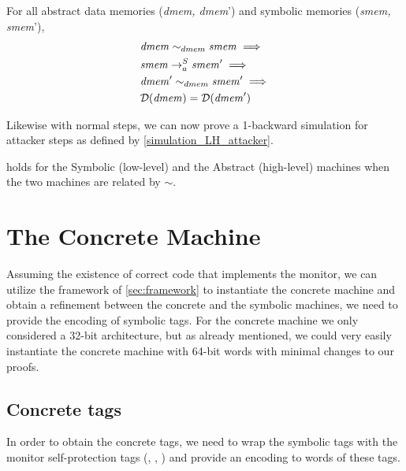 \begin{lemma}
\label{dmem_attacker_preserves_domain}
  For all abstract data memories (\textit{dmem, dmem}')
  and symbolic memories (\textit{smem, smem}'),
  \begin{align*}
    & \mathit{dmem} \sim_{dmem} \mathit{smem} \implies \\
    & \stepa{\mathit{smem}}{\mathit{smem}'}{S} \implies \\
    & \mathit{dmem}' \sim_{dmem} \mathit{smem}' \implies \\
    & \mathcal{D}(\mathit{dmem}) = \mathcal{D}(\mathit{dmem}')
  \end{align*}
\end{lemma}

Likewise with normal steps, we can now prove a 1-backward
simulation for attacker steps as defined by \cref{simulation_LH_attacker}.

\begin{theorem}
\label{simulation_SA_attacker}
 holds for the Symbolic (low-level) and
the Abstract (high-level) machines when the two machines are related
by $\sim$.
\end{theorem}

\section{The Concrete  Machine}\label{sec:concrete_cfi}

Assuming the existence of correct code that implements the \CFI
monitor, we can utilize the framework of \cref{sec:framework} to
instantiate the concrete machine and obtain a refinement between the
concrete and the symbolic machines, we need to provide the encoding of
symbolic tags. For the concrete machine we only considered a 32-bit
architecture, but as already mentioned, we could very easily
instantiate the concrete machine with 64-bit words with minimal
changes to our proofs.

\subsection{Concrete tags}\label{sec:concrete_tags}

In order to obtain the concrete tags, we need to wrap the symbolic
tags with the monitor self-protection tags (\USERname, \ENTRYname,
\MONITOR) and provide an encoding to words of these tags.


